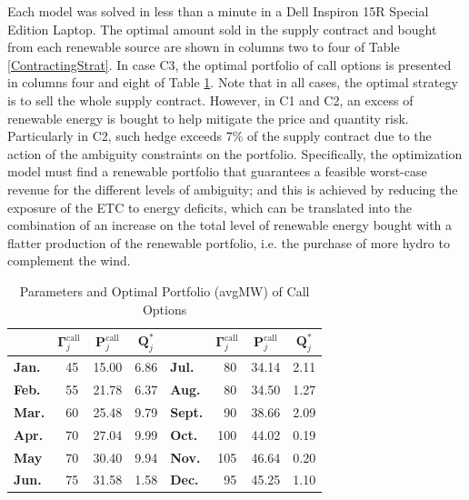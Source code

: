 	Each model was solved in less than a minute in a Dell Inspiron 15R Special Edition Laptop. The optimal amount sold in the supply contract and bought from each renewable source are shown in columns two to four of Table \ref{ContractingStrat}. In case C3, the optimal portfolio of call options is presented in columns four and eight of Table \ref{Table_CallPriceStrike}. Note that in all cases, the optimal strategy is to sell the whole supply contract. However, in C1 and C2, an excess of renewable energy is bought to help mitigate the price and quantity risk. Particularly in C2, such hedge exceeds 7\% of the supply contract due to the action of the ambiguity constraints on the portfolio. Specifically, the optimization model must find a renewable portfolio that guarantees a feasible worst-case revenue for the different levels of ambiguity; and this is achieved by reducing the exposure of the ETC to energy deficits, which can be translated into the combination of an increase on the total level of renewable energy bought with a flatter production of the renewable portfolio, i.e. the purchase of more hydro to complement the wind.
%
\begin{table}
	\renewcommand{\arraystretch}{1.2}
	\centering
	\caption{Parameters and Optimal Portfolio (avgMW) of Call Options}
	\begin{tabular}{ l | c  c  c || l | c  c  c }
		& $\boldsymbol{\Gamma}_{j}^{\text{call}}$ & $\boldsymbol{P}_{j}^{\text{call}}$ & $\boldsymbol{Q}_{j}^{*}$ &  & $\boldsymbol{\Gamma}_{j}^{\text{call}}$ & $\boldsymbol{P}_{j}^{\text{call}}$ & $\boldsymbol{Q}_{j}^{*}$ \\
		\hline
		\textbf{Jan.} & \textcolor{white}{0}45 & 15.00 & 6.86 & \textbf{Jul.} & \textcolor{white}{0}80 & 34.14 & 2.11 \\
		\textbf{Feb.} & \textcolor{white}{0}55 & 21.78 & 6.37 & \textbf{Aug.} & \textcolor{white}{0}80 & 34.50 & 1.27 \\
		\textbf{Mar.} & \textcolor{white}{0}60 & 25.48 & 9.79 & \textbf{Sept.} & \textcolor{white}{0}90 & 38.66 & 2.09 \\ 
		\textbf{Apr.} & \textcolor{white}{0}70 & 27.04 & 9.99 & \textbf{Oct.} & 100 & 44.02 & 0.19\\ 
		\textbf{May} & \textcolor{white}{0}70 & 30.40 & 9.94 & \textbf{Nov.} & 105 & 46.64 & 0.20 \\
		\textbf{Jun.} & \textcolor{white}{0}75 & 31.58 & 1.58 & \textbf{Dec.} & \textcolor{white}{0}95 & 45.25 & 1.10
	\end{tabular}
	\label{Table_CallPriceStrike}
\end{table}
